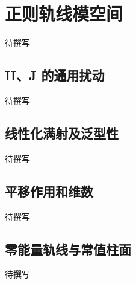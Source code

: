 
% 
% 
% 

\section{正则轨线模空间}
\label{g4:sec:2505}

待撰写

\subsection{H、J 的通用扰动}
\label{g4:subsec:2505:01}
待撰写

\subsection{线性化满射及泛型性}
\label{g4:subsec:2505:02}
待撰写

\subsection{平移作用和维数}
\label{g4:subsec:2505:03}
待撰写

\subsection{零能量轨线与常值柱面}
\label{g4:subsec:2505:04}
待撰写
